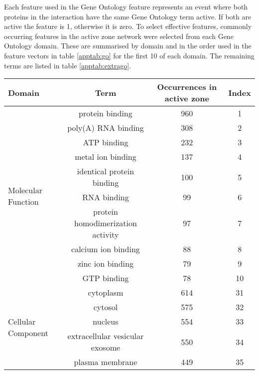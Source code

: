 Each feature used in the Gene Ontology feature represents an event where both proteins in the interaction have the same Gene Ontology term active.
If both are active the feature is 1, otherwise it is zero.
To select effective features, commonly occurring features in the active zone network were selected from each Gene Ontology domain.
These are summarised by domain and in the order used in the feature vectors in table \ref{apptab:go} for the first 10 of each domain.
The remaining terms are listed in table \ref{apptab:extrago}.

\begin{table}
    \centering
    \begin{tabular}{l c c c}
        Domain              & Term                      & Occurrences in active zone & Index\\
        \hline
        \multirow{10}{*}{Molecular Function}  & protein binding           & 960 & 1 \\
                                              & poly(A) RNA binding       & 308 & 2 \\
                                              & ATP binding               & 232  & 3 \\
                                              & metal ion binding         & 137 & 4 \\
                                              & identical protein binding & 100 & 5 \\
                                              & RNA binding               & 99 & 6 \\
                                              & protein homodimerization activity & 97 & 7 \\
                                              & calcium ion binding & 88 & 8 \\
                                              & zinc ion binding & 79 & 9 \\
                                              & GTP binding & 78 & 10 \\
        \hline
        \multirow{10}{*}{Cellular Component}  & cytoplasm & 614 & 31 \\
                                              & cytosol & 575 & 32 \\
                                              & nucleus & 554 & 33 \\
                                              & extracellular vesicular exosome & 550 & 34 \\
                                              & plasma membrane & 449 & 35 \\

\end{tabular}
\end{table}
